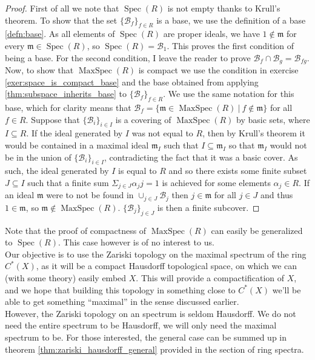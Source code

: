 \documentclass[a4paper]{book}
\theoremstyle{definition}
\theoremstyle{ejemplo}
\theoremstyle{demostracion}
\DeclareMathOperator{\maxspec}{MaxSpec}
\DeclareMathOperator{\spec}{Spec}
\begin{document}
\begin{proof}
	First of all we note that $\spec(R)$ is not empty thanks to Krull's theorem. To show that the set $\{ \mathcal{B}_f\}_{f \in R}$ is a base, we use the definition  of a base \eqref{defn:base}. As all elements of $\spec(R)$ are proper ideals, we have $1 \not \in \mathfrak{m}$ for every $\mathfrak{m} \in \spec(R)$, so $\spec(R) = \mathcal{B}_{1}$. This proves the first condition of being a base. For the second condition, I leave the reader to prove $\mathcal{B}_{f} \cap \mathcal{B}_{g} = \mathcal{B}_{fg}$.\\ 
	
	Now, to show that $\maxspec(R)$ is compact we use the condition in exercise \eqref{exer:space_is_compact_base} and the base obtained from applying \eqref{thm:subspace_inherits_base} to $\{ \mathcal{B}_f\}_{f \in R}$. We use the same notation for this base, which for clarity means that $\mathcal{B}_f = \{\mathfrak{m} \in \maxspec(R)\ |\ f \not \in \mathfrak{m} \}$ for all $f \in R$. Suppose that $\{ \mathcal{B}_i \}_{i \in I}$ is a covering of $\maxspec(R)$ by basic sets, where $I \subseteq R$. If the ideal generated by $I$ was not equal to $R$, then by Krull's theorem it would be contained in a maximal ideal $\mathfrak{m}_I$ such that $I \subseteq \mathfrak{m}_I$ so that $\mathfrak{m}_I$ would not be in the union of $\{ \mathcal{B}_i \}_{i \in I}$, contradicting the fact that it was a basic cover. As such, the ideal generated by $I$ is equal to $R$ and so there exists some finite subset $J \subseteq I$ such that a finite sum $\Sigma_{j \in J} \alpha_j j = 1$ is achieved for some elements $\alpha_j \in R$. If an ideal $\mathfrak{m}$ were to not be found in $\cup_{j \in J} \mathcal{B}_j$ then $j \in \mathfrak{m}$ for all $j \in J$ and thus $1 \in \mathfrak{m}$, so $\mathfrak{m} \not \in \maxspec(R)$. $\{ \mathcal{B}_j \}_{j \in J}$ is then a finite subcover.
\end{proof}

Note that the proof of compactness of $\maxspec(R)$ can easily be generalized to $\spec(R)$. This case however is of no interest to us.\\ 
Our objective is to use the Zariski topology on the maximal spectrum of the ring $C^*(X)$, as it will be a compact Hausdorff topological space, on which we can (with some theory) easily embed $X$. This will provide a compactification of $X$, and we hope that building this topology in something close to $C^*(X)$ we'll be able to get something ``maximal'' in the sense discussed earlier.\\ 
However, the Zariski topology on an spectrum is seldom Hausdorff. We do not need the entire spectrum to be Hausdorff, we will only need the maximal spectrum to be. For those interested, the general case can be summed up in theorem \eqref{thm:zariski_hausdorff_general} provided in the section of ring spectra.
\end{document}
